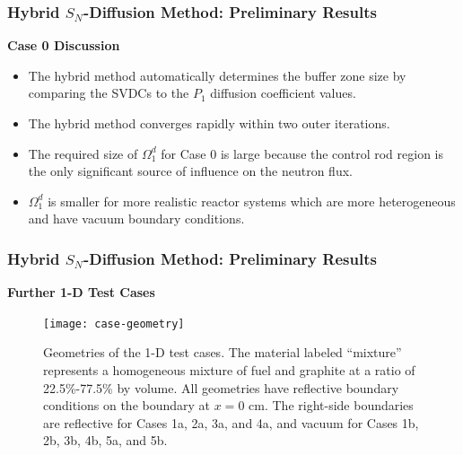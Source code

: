 \begin{frame}
  \frametitle{Hybrid $S_N$-Diffusion Method: Preliminary Results}
  \textbf{Case 0 Discussion}
  \begin{itemize}
    \item The hybrid method automatically determines the buffer zone size by comparing the SVDCs
      to the $P_1$ diffusion coefficient values.
    \item The hybrid method converges rapidly within two outer iterations.
    \item The required size of $\Omega^d_1$ for Case 0 is large because the control rod region is
      the only significant source of influence on the neutron flux.
    \item $\Omega^d_1$ is smaller for more realistic reactor systems which are more heterogeneous
      and have vacuum boundary conditions.
  \end{itemize}
\end{frame}

\begin{frame}
  \frametitle{Hybrid $S_N$-Diffusion Method: Preliminary Results}
  \textbf{Further 1-D Test Cases}
  \begin{figure}[htb!]
    \centering
    \texttt{[image: case-geometry]}
    \caption{Geometries of the 1-D test cases. The material labeled ``mixture'' represents a
      homogeneous mixture of fuel and graphite at a ratio of 22.5\%-77.5\% by volume. All geometries
      have reflective boundary conditions on the boundary at $x=0$ cm. The right-side boundaries are
      reflective for Cases 1a, 2a, 3a, and 4a, and vacuum for Cases 1b, 2b, 3b, 4b, 5a, and 5b.}
    \label{fig:case-geom}
  \end{figure}
\end{frame}
